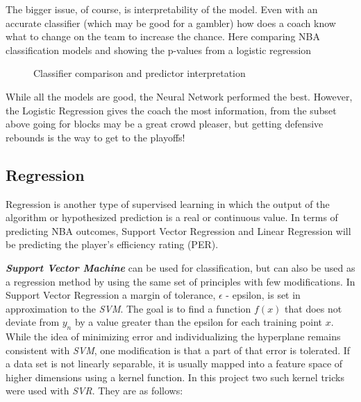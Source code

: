 \documentclass{article}
\begin{document}
The bigger issue, of course, is interpretability of the model. 
Even with an accurate classifier (which may be good for a gambler)
how does a coach know what to change on the team to increase the chance.
Here comparing NBA classification models and showing the p-values from a logistic regression
\begin{figure}[H]
    \centering
    \qquad
    \caption{Classifier comparison and predictor interpretation}%
\end{figure}

While all the models are good, the Neural Network performed the best. However, the Logistic Regression gives the coach the most information, from the subset above going for blocks may be a great crowd pleaser, but getting defensive rebounds is the way to get to the playoffs!

\subsection{Regression} 
Regression is another type of supervised learning in which the output of the algorithm or hypothesized prediction is a real or continuous value. In terms of predicting NBA outcomes, Support Vector Regression and Linear Regression will be predicting the player's efficiency rating (PER). 

\textbf{\textit{Support Vector Machine}} can be used for classification, but can also be used as a regression method by using the same set of principles with few modifications.
In Support Vector Regression a margin of tolerance, $\epsilon$ - epsilon, is set in approximation to the \textit{SVM}.
The goal is to find a function $f(x)$ that does not deviate from $y_n$ by a value greater than the epsilon for each training point $x$.
While the idea of minimizing error and individualizing the hyperplane remains consistent with \textit{SVM}, one modification is that a part of that error is tolerated.
If a data set is not linearly separable, it is usually mapped into a feature space of higher dimensions using a kernel function.
In this project two such kernel tricks were used with \textit{SVR}. They are as follows:
\end{document}
